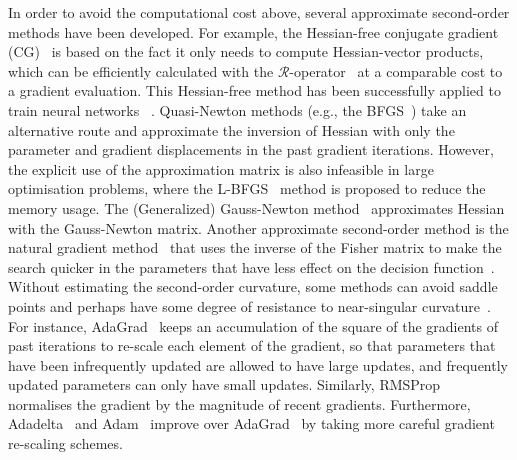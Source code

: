 \documentclass[10pt,journal,compsoc]{IEEEtran}
\begin{document}
In order to avoid the computational cost above, several approximate second-order methods have been developed.  For example, the Hessian-free conjugate gradient (CG)~\cite{wright1999numerical} is based on the fact it only needs to compute Hessian-vector products, which can be efficiently calculated with the $\mathcal{R}$-operator~\cite{pearlmutter1994fast} at a comparable cost to a gradient evaluation.  This Hessian-free method has been successfully applied to train neural networks ~\cite{martens2010deep, kiros2013training}.
Quasi-Newton methods (e.g., the BFGS~\cite{fletcher2013practical, bottou2016optimization}) take an alternative route and approximate the inversion of Hessian with only the parameter and gradient displacements in the past gradient iterations.  However, the explicit use of the approximation matrix is also infeasible in large optimisation problems, where the L-BFGS~\cite{byrd1995limited} method is proposed to reduce the memory usage.
The (Generalized) Gauss-Newton method~\cite{bertsekas1996incremental,schraudolph2001fast} approximates Hessian with the Gauss-Newton matrix.
Another approximate second-order method is the natural gradient method~\cite{amari1998natural} that uses the inverse of the Fisher matrix to make the search quicker in the parameters that have less effect on the decision function~\cite{bottou2016optimization}.
Without estimating the second-order curvature, some methods can avoid saddle points and perhaps have some degree of resistance to near-singular curvature~\cite{bottou2016optimization}.
For instance, AdaGrad~\cite{duchi2011adaptive} keeps an accumulation of the square of the gradients of past iterations to re-scale each element of the gradient, so that parameters that have been infrequently updated are allowed to have large updates, and frequently updated parameters can only have small updates.
Similarly, RMSProp~\cite{tieleman2012lecture} normalises the gradient by the magnitude of recent gradients. 
Furthermore, Adadelta~\cite{zeiler2012adadelta} and Adam~\cite{kingma2014adam} improve over AdaGrad~\cite{duchi2011adaptive} by taking more careful gradient re-scaling schemes.
\end{document}
